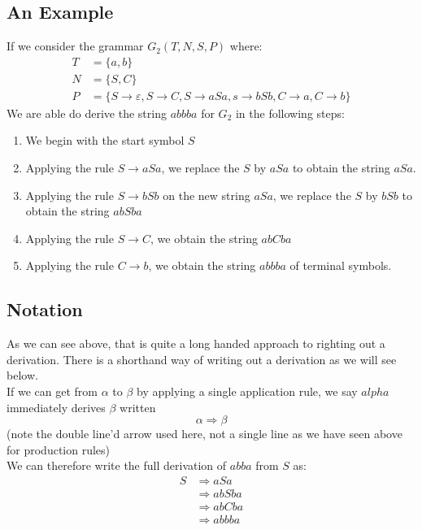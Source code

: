 \subsection{An Example}
If we consider the grammar $G_2 (T, N, S, P)$ where:
\begin{align*}
    T &= \{a,b\}\\
    N &= \{S,C\}\\
    P &= \{S \rightarrow \varepsilon, S \rightarrow C, S \rightarrow aSa, s \rightarrow bSb, C \rightarrow a, C \rightarrow b \}
\end{align*}
We are able do derive the string $abbba$ for $G_2$ in the following steps:
\begin{enumerate}
    \item We begin with the start symbol $S$
    \item Applying the rule $S \rightarrow aSa$, we replace the $S$ by $aSa$ to obtain the string $aSa$.
    \item Applying the rule $S \rightarrow bSb$ on the new string $aSa$, we replace the $S$ by $bSb$ to obtain the string $abSba$
    \item Applying the rule $S \rightarrow C$, we obtain the string $abCba$
    \item Applying the rule $C \rightarrow b$, we obtain the string $abbba$ of terminal symbols.
\end{enumerate}

\subsection{Notation}
As we can see above, that is quite a long handed approach to righting out a derivation. There is a shorthand way of writing out a derivation as we will see below.\\

If we can get from $\alpha$ to $\beta$ by applying a single application rule, we say $alpha$ immediately derives $\beta$ written
\[\alpha \Rightarrow \beta\]
(note the double line'd arrow used here, not a single line as we have seen above for production rules)\\

We can therefore write the full derivation of $abba$ from $S$ as:
\begin{align*}
    S & \Rightarrow aSa\\
    & \Rightarrow abSba\\
    & \Rightarrow abCba\\
    & \Rightarrow abbba
\end{align*}

